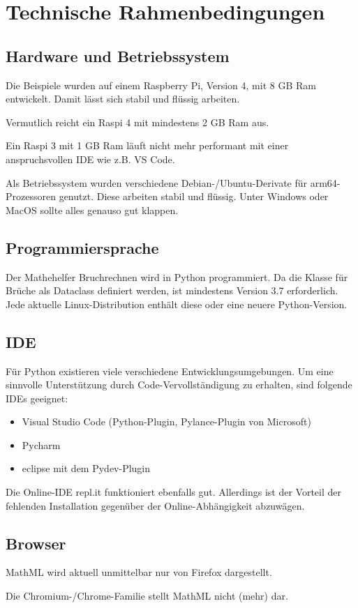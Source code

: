 \section{Technische Rahmenbedingungen}

\subsection*{Hardware und Betriebssystem}

Die Beispiele wurden auf einem Raspberry Pi, Version 4, mit 8 GB Ram entwickelt. Damit lässt sich stabil und flüssig arbeiten.

Vermutlich reicht ein Raspi 4 mit mindestens 2 GB Ram aus.

Ein Raspi 3 mit 1 GB Ram läuft nicht mehr performant mit einer anspruchsvollen IDE wie z.B. VS Code.

Als Betriebssystem wurden verschiedene Debian-/Ubuntu-Derivate für arm64-Prozessoren genutzt. Diese arbeiten stabil und flüssig. Unter Windows oder MacOS sollte alles genauso gut klappen.

\subsection*{Programmiersprache}

Der Mathehelfer Bruchrechnen wird in Python programmiert. Da die Klasse für Brüche als Dataclass definiert werden, ist mindestens Version 3.7 erforderlich. Jede aktuelle Linux-Distribution enthält diese oder eine neuere Python-Version.

\subsection*{IDE}

Für Python existieren viele verschiedene Entwicklungsumgebungen. Um eine sinnvolle Unterstützung durch Code-Vervollständigung zu erhalten, sind folgende IDEs geeignet:
\begin{itemize}
	\item Visual Studio Code (Python-Plugin, Pylance-Plugin von Microsoft)
	\item Pycharm
	\item eclipse mit dem Pydev-Plugin
\end{itemize}

Die Online-IDE repl.it funktioniert ebenfalls gut. Allerdings ist der Vorteil der fehlenden Installation gegenüber der Online-Abhängigkeit abzuwägen.

\subsection*{Browser}

MathML wird aktuell unmittelbar nur von Firefox dargestellt.

Die Chromium-/Chrome-Familie stellt MathML nicht (mehr)  dar.